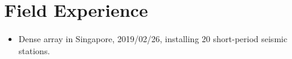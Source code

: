 \section{Field Experience}
\begin{itemize}
\item Dense array in Singapore,
      2019/02/26, installing 20 short-period seismic stations.
\end{itemize}
